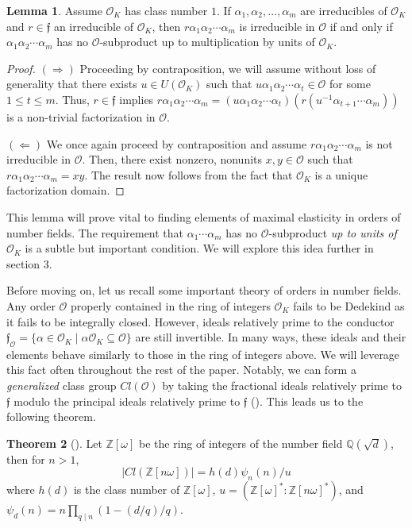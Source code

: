 \documentclass{amsart}
\theoremstyle{definition}
\newtheorem{lem}{Lemma}[section]
\newtheorem{thm}[lem]{Theorem}
\newcommand{\MO}{\mathcal{O}}
\newcommand{\bbz}{\mathbb{Z}}
\newcommand{\bbq}{\mathbb{Q}}
\newcommand{\imp}{\ensuremath{\Rightarrow{}}}
\newcommand{\nimp}{\ensuremath{\Leftarrow{}}}
\renewcommand{\leq}{\leqslant}
\numberwithin{equation}{section}
\begin{document}
\begin{lem}
    Assume $\MO_K$ has class number $1$. If $\alpha_1, \alpha_2, \dots, \alpha_m$ are irreducibles of $\MO_K$ and $r \in \mathfrak{f}$ an irreducible of $\MO_K$, then $r \alpha_1 \alpha_2 \dotsm \alpha_m$ is irreducible in $\MO$ if and only if $\alpha_1 \alpha_2 \dotsm \alpha_m$ has no $\MO$-subproduct up to multiplication by units of $\MO_K$.
\end{lem}

\begin{proof}
    $(\imp\!\!)$ Proceeding by contraposition, we will assume without loss of generality that there exists $u \in U(\MO_K)$ such that $u \alpha_1 \alpha_2 \dotsm \alpha_t \in \MO$ for some $1 \leq t \leq m$. Thus, $r \in \mathfrak{f}$ implies $r \alpha_1 \alpha_2 \dotsm \alpha_m = (u \alpha_1 \alpha_2 \dotsm \alpha_t)(r(u^{-1}\alpha_{t+1} \dotsm \alpha_m))$ is a non-trivial factorization in $\MO$.

    $(\nimp\!\!)$ We once again proceed by contraposition and assume $r \alpha_1 \alpha_2 \dotsm \alpha_m$ is not irreducible in $\MO$. Then, there exist nonzero, nonunits $x,y \in \MO$ such that $r \alpha_1 \alpha_2 \dotsm \alpha_m = xy$. The result now follows from the fact that $\MO_K$ is a unique factorization domain.
\end{proof}

This lemma will prove vital to finding elements of maximal elasticity in orders of number fields. The requirement that $\alpha_1 \dotsm \alpha_m$ has no $\MO$-subproduct \textit{up to units of $\MO_K$} is a subtle but important condition. We will explore this idea further in section 3.

Before moving on, let us recall some important theory of orders in number fields. Any order $\MO$ properly contained in the ring of integers $\MO_K$ fails to be Dedekind as it fails to be integrally closed. However, ideals relatively prime to the conductor $\mathfrak{f}_\MO = \{\alpha \in \MO_K \mid \alpha \MO_K \subseteq \MO\}$ are still invertible.  In many ways, these ideals and their elements behave similarly to those in the ring of integers above. We will leverage this fact often throughout the rest of the paper. Notably, we can form a \textit{generalized} class group $Cl(\MO)$ by taking the fractional ideals relatively prime to $\mathfrak{f}$ modulo the principal ideals relatively prime to $\mathfrak{f}$ (\cite{cox2022primes}). This leads us to the following theorem.

\begin{thm}[\cite{cohn1980advanced}]
    Let $\bbz[\omega]$ be the ring of integers of the number field $\bbq(\sqrt{d})$, then for $n > 1$, 
    \[
    |Cl(\bbz[n\omega])| = h(d)\psi_n(n)/u
    \]
    where $h(d)$ is the class number of $\bbz[\omega]$, $u = (\bbz[\omega]^* : \bbz[n\omega]^*)$, and $\psi_d(n) = n \underset{q \mid n}{\prod}(1- (d/q)/q)$.
\end{thm}
\end{document}
